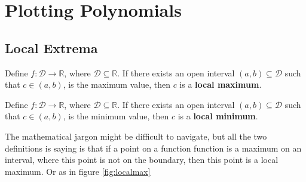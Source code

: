 \documentclass[11pt]{article}
\numberwithin{lemma}{section}
\numberwithin{equation}{section}
\numberwithin{define}{section}
\numberwithin{prop}{section}
\numberwithin{figure}{section}
\numberwithin{thm}{section}
\numberwithin{cor}{section}
\newcounter{ex}[section]
\numberwithin{ex}{section}
\def\real{\mathbb{R}}
\begin{document}
\section{Plotting Polynomials}
\subsection{Local Extrema}
\begin{define}
	Define $f:\mathcal{D}\to\real$, where $\mathcal{D}\subseteq\real$. If there exists an open interval $(a,b)\subseteq\mathcal{D}$ such that $c\in(a,b)$, is the maximum value, then $c$ is a \textbf{local maximum}.
\end{define}
\begin{define}
	Define $f:\mathcal{D}\to\real$, where $\mathcal{D}\subseteq\real$. If there exists an open interval $(a,b)\subseteq\mathcal{D}$ such that $c\in(a,b)$, is the minimum value, then $c$ is a \textbf{local minimum}.
\end{define}

The mathematical jargon might be difficult to navigate, but all the two definitions is saying is that if a point on a function function is a maximum on an interval, where this point is not on the boundary, then this point is a local maximum. Or as in figure \eqref{fig:localmax}
\begin{figure}
	\centering
\end{figure}
\end{document}
